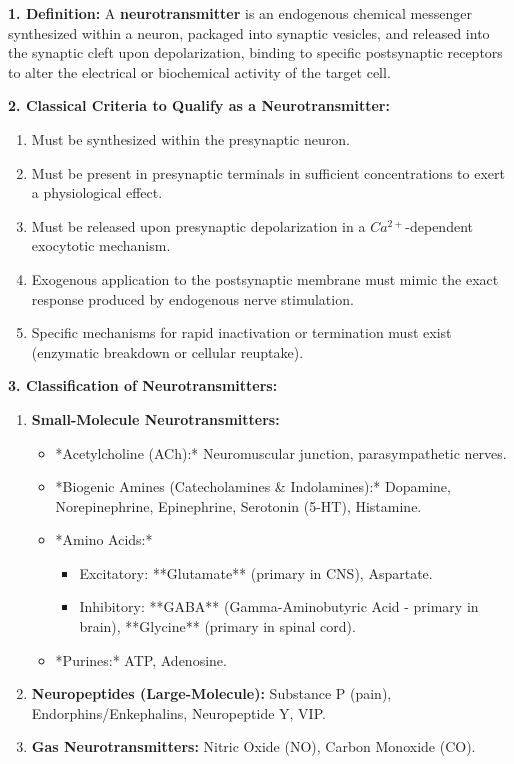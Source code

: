 \documentclass[11pt,a4paper]{article}
\begin{document}
\begin{ansbox}
\textbf{1. Definition:}
A \textbf{neurotransmitter} is an endogenous chemical messenger synthesized within a neuron, packaged into synaptic vesicles, and released into the synaptic cleft upon depolarization, binding to specific postsynaptic receptors to alter the electrical or biochemical activity of the target cell.

\textbf{2. Classical Criteria to Qualify as a Neurotransmitter:}
\begin{enumerate}[leftmargin=*]
    \item Must be synthesized within the presynaptic neuron.
    \item Must be present in presynaptic terminals in sufficient concentrations to exert a physiological effect.
    \item Must be released upon presynaptic depolarization in a $Ca^{2+}$-dependent exocytotic mechanism.
    \item Exogenous application to the postsynaptic membrane must mimic the exact response produced by endogenous nerve stimulation.
    \item Specific mechanisms for rapid inactivation or termination must exist (enzymatic breakdown or cellular reuptake).
\end{enumerate}

\textbf{3. Classification of Neurotransmitters:}
\begin{enumerate}[leftmargin=*]
    \item \textbf{Small-Molecule Neurotransmitters:}
    \begin{itemize}
        \item *Acetylcholine (ACh):* Neuromuscular junction, parasympathetic nerves.
        \item *Biogenic Amines (Catecholamines \& Indolamines):* Dopamine, Norepinephrine, Epinephrine, Serotonin (5-HT), Histamine.
        \item *Amino Acids:*
        \begin{itemize}
            \item Excitatory: **Glutamate** (primary in CNS), Aspartate.
            \item Inhibitory: **GABA** (Gamma-Aminobutyric Acid - primary in brain), **Glycine** (primary in spinal cord).
        \end{itemize}
        \item *Purines:* ATP, Adenosine.
    \end{itemize}
    \item \textbf{Neuropeptides (Large-Molecule):} Substance P (pain), Endorphins/Enkephalins, Neuropeptide Y, VIP.
    \item \textbf{Gas Neurotransmitters:} Nitric Oxide (NO), Carbon Monoxide (CO).
\end{enumerate}


\end{ansbox}
\end{document}

